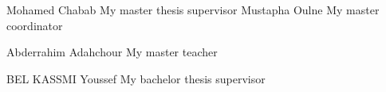 

\begin{cvhonors}
  \cvhonor
        {Mohamed Chabab} %
  {My master thesis supervisor \href{mailto:mchabab@uca.ac.ma}{\faEnvelope} } %
    {} %
    {} %
    \cvhonor
        {Mustapha Oulne} %
  {My master coordinator \href{mailto:oulne@uca.ac.ma}{\faEnvelope}} %
    {} %
    {} %

        \cvhonor
        {Abderrahim Adahchour} %
        {My master teacher \href{mailto:adahchour@uca.ac.ma}{\faEnvelope}} %
    {} %
    {} %
    
            \cvhonor
            {BEL KASSMI Youssef} %
        {My bachelor thesis supervisor \href{mailto:y.belkassmi@gmail.com}{\faEnvelope}} %
    {} %
    {} %


     
    

\end{cvhonors}
